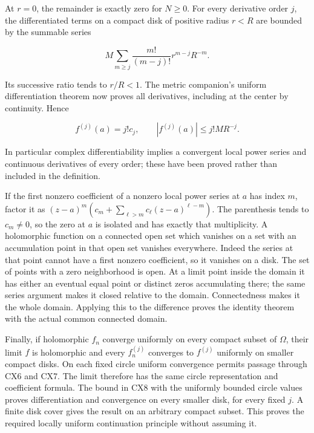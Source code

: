 \documentclass[
  11pt,
]{article}
\makeatletter
\let\ReaderOriginalAnchorStart\hyper@anchorstart
\let\ReaderOriginalAnchorEnd\hyper@anchorend
\let\ReaderPendingAliases\@empty
\def\ReaderArmAliases#1{\gdef\ReaderPendingAliases{#1}}
\def\hyper@anchorstart#1{\ReaderIfNativeAnchorTF{#1}{\ReaderPendingAliases\global\let\ReaderPendingAliases\@empty}{}\ReaderOriginalAnchorStart{#1}}
\makeatother
\begin{document}
At \(r=0\), the remainder is exactly zero for \(N\geq0\). For every
derivative order \(j\), the differentiated terms on a compact disk of
positive radius \(r<R\) are bounded by the summable series

\[
M\sum_{m\geq j}\frac{m!}{(m-j)!}r^{m-j}R^{-m}.
\tag{CX8}
\]

Its successive ratio tends to \(r/R<1\). The metric companion's uniform
differentiation theorem now proves all derivatives, including at the
center by continuity. Hence

\[
f^{(j)}(a)=j!c_j,\qquad |f^{(j)}(a)|\leq j!MR^{-j}.
\tag{CX9}
\]

In particular complex differentiability implies a convergent local power
series and continuous derivatives of every order; these have been proved
rather than included in the definition.

If the first nonzero coefficient of a nonzero local power series at
\(a\) has index \(m\), factor it as
\((z-a)^m(c_m+\sum_{\ell>m}c_\ell(z-a)^{\ell-m})\). The parenthesis
tends to \(c_m\ne0\), so the zero at \(a\) is isolated and has exactly
that multiplicity. A holomorphic function on a connected open set which
vanishes on a set with an accumulation point in that open set vanishes
everywhere. Indeed the series at that point cannot have a first nonzero
coefficient, so it vanishes on a disk. The set of points with a zero
neighborhood is open. At a limit point inside the domain it has either
an eventual equal point or distinct zeros accumulating there; the same
series argument makes it closed relative to the domain. Connectedness
makes it the whole domain. Applying this to the difference proves the
identity theorem with the actual common connected domain.

Finally, if holomorphic \(f_n\) converge uniformly on every compact
subset of \(\Omega\), their limit \(f\) is holomorphic and every
\(f_n^{(j)}\) converges to \(f^{(j)}\) uniformly on smaller compact
disks. On each fixed circle uniform convergence permits passage through
CX6 and CX7. The limit therefore has the same circle representation and
coefficient formula. The bound in CX8 with the uniformly bounded circle
values proves differentiation and convergence on every smaller disk, for
every fixed \(j\). A finite disk cover gives the result on an arbitrary
compact subset. This proves the required locally uniform continuation
principle without assuming it.

\ReaderArmAliases{\ReaderOriginalAnchorStart{AN03-CN-COMPLEX-003}\ReaderOriginalAnchorEnd\begingroup\expandafter\def\csname @currentHref\endcsname{AN03-CN-COMPLEX-003}\label{AN03-CN-COMPLEX-003}\endgroup\ReaderOriginalAnchorStart{the-full-dominated-holomorphic-integral-map}\ReaderOriginalAnchorEnd}
\end{document}
